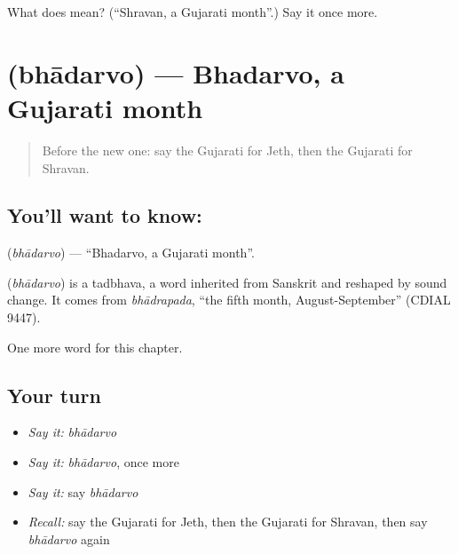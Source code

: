 \begin{tcolorbox}[breakable,colback=teal!4,colframe=teal!35!black,title={Before you move on}]
What does  mean? (\textquotedblleft{}Shravan, a Gujarati month\textquotedblright{}.) Say it once more.
\end{tcolorbox}
\section[\texorpdfstring{\gu{ભાદરવો} (bhādarvo)}{ભાદરવો (bhādarvo)}]{ (bhādarvo) — Bhadarvo, a Gujarati month}

\label{lesson:GU-C98-bhadarvo}



\begin{quote}
Before the new one: say the Gujarati for Jeth, then the Gujarati for Shravan.
\end{quote}

\subsection*{You'll want to know: }
\textbf{} (\emph{bhādarvo}) — \textquotedblleft{}Bhadarvo, a Gujarati month\textquotedblright{}.

\begin{cousinweb}
\textbf{} (\emph{bhādarvo}) is a tadbhava, a word inherited from Sanskrit and reshaped by sound change. It comes from \emph{bhādrapada}, \textquotedblleft{}the fifth month, August-September\textquotedblright{} (CDIAL 9447).
\end{cousinweb}

\begin{grammarlens}[title={What you've built}]
One more word for this chapter.
\end{grammarlens}

\subsection*{Your turn}
\begin{itemize}
\raggedright
  \item \emph{Say it:} \emph{bhādarvo}
  \item \emph{Say it:} \emph{bhādarvo}, once more
  \item \emph{Say it:} say \emph{bhādarvo}
  \item \emph{Recall:} say the Gujarati for Jeth, then the Gujarati for Shravan, then say \emph{bhādarvo} again
\end{itemize}


